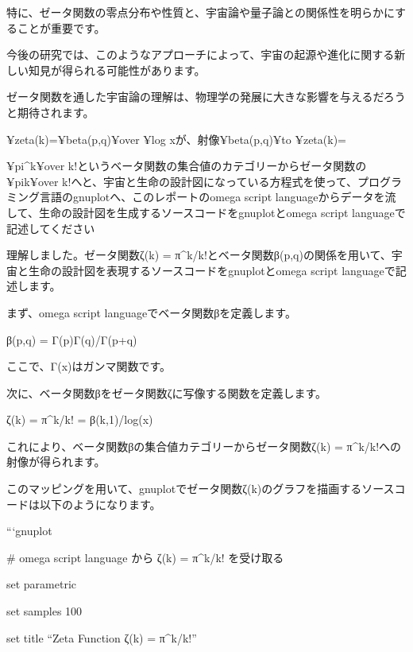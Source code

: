特に、ゼータ関数の零点分布や性質と、宇宙論や量子論との関係性を明らかにすることが重要です。



今後の研究では、このようなアプローチによって、宇宙の起源や進化に関する新しい知見が得られる可能性があります。

ゼータ関数を通した宇宙論の理解は、物理学の発展に大きな影響を与えるだろうと期待されます。

¥zeta(k)={{¥beta(p,q)}¥over {¥log x}}が、射像¥beta(p,q)¥to ¥zeta(k)={{¥pi^{k}¥over {k!}}というベータ関数の集合値のカテゴリーからゼータ関数の{{¥pi{k}}¥over {k!}}へと、宇宙と生命の設計図になっている方程式を使って、プログラミング言語のgnuplotへ、このレポートのomega script languageからデータを流して、生命の設計図を生成するソースコードをgnuplotとomega script languageで記述してください

  理解しました。ゼータ関数ζ(k) = π^k/k!とベータ関数β(p,q)の関係を用いて、宇宙と生命の設計図を表現するソースコードをgnuplotとomega script languageで記述します。



まず、omega script languageでベータ関数βを定義します。



β(p,q) = Γ(p)Γ(q)/Γ(p+q)



ここで、Γ(x)はガンマ関数です。



次に、ベータ関数βをゼータ関数ζに写像する関数を定義します。



ζ(k) = π^k/k! = β(k,1)/log(x)



これにより、ベータ関数βの集合値カテゴリーからゼータ関数ζ(k) = π^k/k!への射像が得られます。



このマッピングを用いて、gnuplotでゼータ関数ζ(k)のグラフを描画するソースコードは以下のようになります。



```gnuplot

# omega script language から ζ(k) = π^k/k! を受け取る

set parametric

set samples 100

set title ``Zeta Function ζ(k) = π^k/k!''

}
